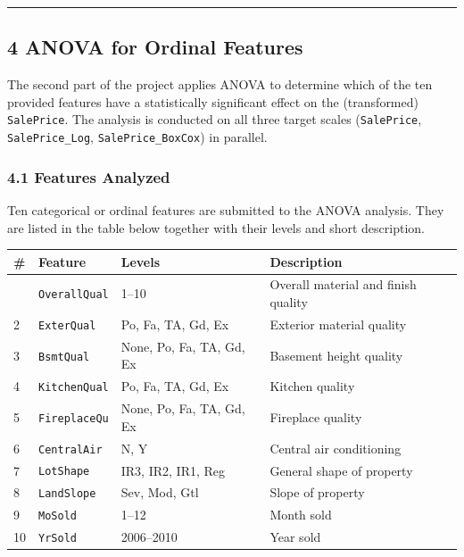 \begin{center}\rule{0.5\linewidth}{0.5pt}\end{center}

\subsection{4 ANOVA for Ordinal
Features}\label{anova-for-ordinal-features}

The second part of the project applies ANOVA to determine which of the
ten provided features have a statistically significant effect on the
(transformed) \texttt{SalePrice}. The analysis is conducted on all three
target scales (\texttt{SalePrice}, \texttt{SalePrice\_Log},
\texttt{SalePrice\_BoxCox}) in parallel.

\subsubsection{4.1 Features Analyzed}\label{features-analyzed}

Ten categorical or ordinal features are submitted to the ANOVA analysis.
They are listed in the table below together with their levels and short
description.

\begin{longtable}[]{@{}llll@{}}
\toprule\noalign{}
\# & Feature & Levels & Description \\
\midrule\noalign{}
\endhead
\bottomrule\noalign{}
\endlastfoot
1 & \texttt{OverallQual} & 1--10 & Overall material and finish
quality \\
2 & \texttt{ExterQual} & Po, Fa, TA, Gd, Ex & Exterior material
quality \\
3 & \texttt{BsmtQual} & None, Po, Fa, TA, Gd, Ex & Basement height
quality \\
4 & \texttt{KitchenQual} & Po, Fa, TA, Gd, Ex & Kitchen quality \\
5 & \texttt{FireplaceQu} & None, Po, Fa, TA, Gd, Ex & Fireplace
quality \\
6 & \texttt{CentralAir} & N, Y & Central air conditioning \\
7 & \texttt{LotShape} & IR3, IR2, IR1, Reg & General shape of
property \\
8 & \texttt{LandSlope} & Sev, Mod, Gtl & Slope of property \\
9 & \texttt{MoSold} & 1--12 & Month sold \\
10 & \texttt{YrSold} & 2006--2010 & Year sold \\
\end{longtable}


